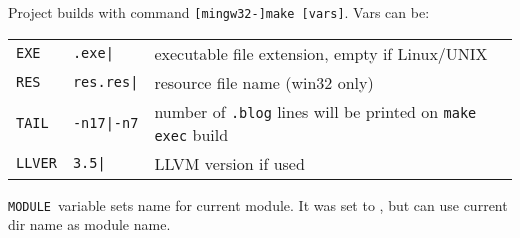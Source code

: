 \label{makes}

Project builds with command \verb|[mingw32-]make [vars]|. Vars can be:

\begin{tabular}{l l l}
\verb$EXE$ & \verb$.exe|$ & executable file extension, empty if Linux/UNIX \\ 
\verb$RES$ & \verb$res.res|$ & resource file name (win32 only) \\
\verb$TAIL$ & \verb$-n17|-n7$ & number of \verb$.blog$ lines
will be printed on \verb$make exec$ build \\
\verb$LLVER$ & \verb$3.5|$ & LLVM version if used \\
\end{tabular}\bigskip

\verb|MODULE|\ variable sets name for current module.
It was set to \bi, but can use current dir name as module name. 


